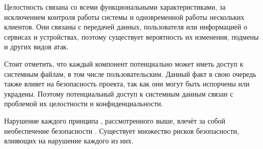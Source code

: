 %
Целостность связана со всеми функциональными характеристиками, за исключением контроля работы системы и одновременной работы нескольких клиентов. 
%
Они связаны с передачей данных, пользователя или информацией о сервисах и устройствах, поэтому существует вероятность их изменения, подмены и других видов атак.

%
Стоит отметить, что каждый компонент  потенциально может иметь доступ к системным файлам, в том числе пользовательским. 
%
Данный факт в свою очередь также влияет на безопасность проекта, так как они могут быть испорчены или украдены. 
%
Поэтому потенциальный доступ к системным данным связан с проблемой их целостности и конфиденциальности. 

%
Нарушение каждого принципа , рассмотренного выше, влечёт за собой необеспечение безопасности . 
%
Существует множество рисков безопасности, влияющих на нарушение каждого из них.